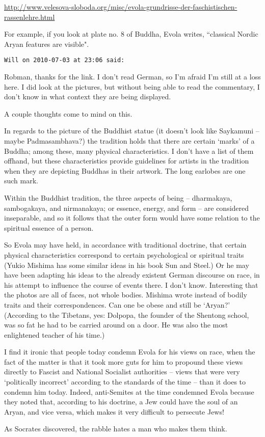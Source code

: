 \begin{footnotesize}
\begin{sffamily}
\url{http://www.velesova-sloboda.org/misc/evola-grundrisse-der-faschistischen-rassenlehre.html}

For example, if you look at plate no. 8 of Buddha, Evola writes, ``classical Nordic Aryan features are visible".


\hfill

\texttt{Will on 2010-07-03 at 23:06 said: }

Robman, thanks for the link. I don't read German, so I'm afraid I'm still at a loss here. I did look at the pictures, but without being able to read the commentary, I don't know in what context they are being displayed.

A couple thoughts come to mind on this.

In regards to the picture of the Buddhist statue (it doesn't look like Saykamuni – maybe Padmasambhava?) the tradition holds that there are certain `marks' of a Buddha; among these, many physical characteristics. I don't have a list of them offhand, but these characteristics provide guidelines for artists in the tradition when they are depicting Buddhas in their artwork. The long earlobes are one such mark.

Within the Buddhist tradition, the three aspects of being – dharmakaya, sambogakaya, and nirmanakaya; or essence, energy, and form – are considered inseparable, and so it follows that the outer form would have some relation to the spiritual essence of a person.

So Evola may have held, in accordance with traditional doctrine, that certain physical characteristics correspond to certain psychological or spiritual traits (Yukio Mishima has some similar ideas in his book Sun and Steel.) Or he may have been adapting his ideas to the already existent German discourse on race, in his attempt to influence the course of events there. I don't know. Interesting that the photos are all of faces, not whole bodies. Mishima wrote instead of bodily traits and their correspondences. Can one be obese and still be `Aryan?' (According to the Tibetans, yes: Dolpopa, the founder of the Shentong school, was so fat he had to be carried around on a door. He was also the most enlightened teacher of his time.)

I find it ironic that people today condemn Evola for his views on race, when the fact of the matter is that it took more guts for him to propound these views directly to Fascist and National Socialist authorities – views that were very `politically incorrect' according to the standards of the time – than it does to condemn him today. Indeed, anti-Semites at the time condemned Evola because they noted that, according to his doctrine, a Jew could have the soul of an Aryan, and vice versa, which makes it very difficult to persecute Jews!

As Socrates discovered, the rabble hates a man who makes them think.


\end{sffamily}\end{footnotesize}
